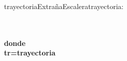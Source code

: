 \documentclass{article}
\begin{document}
\begin{proc}{trayectoriaExtrañaEscalera}{\In trayectoria: \TLista{\float}}{\bool}

\textbf{\\
\\
donde\\
tr=trayectoria\\
\\}
\end{proc}
\end{document}
